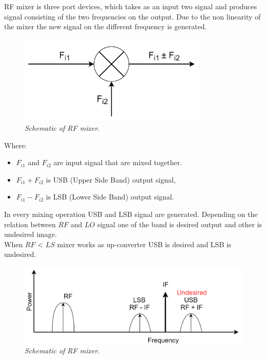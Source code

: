 \documentclass[en,printmode]{mgr}
\begin{document}
		RF mixer is three port devices, which takes as an input two signal and produces signal consisting of 
		the two frequencies on the output. Due to the non linearity of the mixer the new signal on the different
		frequency is generated.
		
		\begin{figure}[!htb]
    		\centering
   			\includegraphics[width=0.8\textwidth]{diag/mixer.png}
    		\caption{\textit{Schematic of RF mixer.}}
		\end{figure}
		
		Where:
		\begin{itemize}
			\item $F_{i1}$ and $F_{i2}$ are input signal that are mixed together.
			\item $F_{i1} + F_{i2}$ is USB (Upper Side Band) output signal,
			\item $F_{i1} - F_{i2}$ is LSB (Lower Side Band) output signal.
		\end{itemize}
		
		In every mixing operation USB and LSB signal are generated. Depending on the relation between $RF$ and $LO$
		signal one of the band is desired output and other is undesired image.
		\\
		
		When $RF$ < $LS$ mixer works as up-converter USB is desired and LSB is undesired.
		\begin{figure}[!htb]
    		\centering
   			\includegraphics[width=\textwidth]{diag/upconv.png}
    		\caption{\textit{Schematic of RF mixer.}}
		\end{figure}
		
\end{document}
